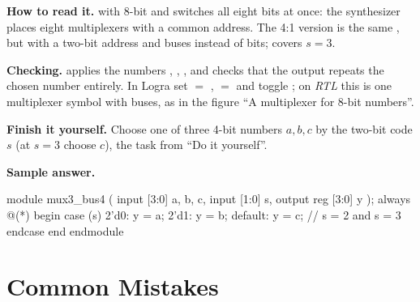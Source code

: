 \textbf{How to read it.}  with 8-bit  and 
switches all eight bits at once: the synthesizer places eight multiplexers with
a common address. The 4:1 version is the same , but with a two-bit
address and buses instead of bits;  covers $s=3$.

\textbf{Checking.}  applies the numbers ,
, ,  and checks that the output repeats the
chosen number entirely. In Logra set  $=$ ,  $=$
 and toggle ; on \emph{RTL} this is one multiplexer symbol with
buses, as in the figure ``A multiplexer for 8-bit numbers''.

\textbf{Finish it yourself.} Choose one of three 4-bit numbers $a,b,c$ by the
two-bit code $s$ (at $s=3$ choose $c$), the task from ``Do it yourself''.

\textbf{Sample answer.}
\begin{vcode}
module mux3_bus4 (
    input  [3:0] a, b, c,
    input  [1:0] s,
    output reg [3:0] y
);
    always @(*) begin
        case (s)
            2'd0:    y = a;
            2'd1:    y = b;
            default: y = c;    // s = 2 and s = 3
        endcase
    end
endmodule
\end{vcode}

\section{Common Mistakes}

